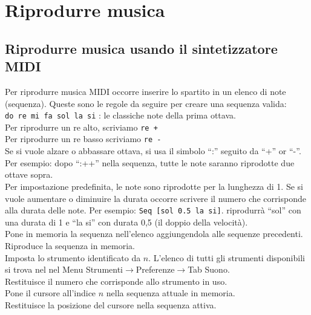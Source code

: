\section{Riprodurre musica}
\subsection{Riprodurre musica usando il sintetizzatore MIDI}
Per riprodurre musica MIDI occorre inserire lo spartito in un elenco di note (sequenza). Queste sono le regole da seguire per creare una sequenza valida:\\
\texttt{do re mi fa sol la si} : le classiche note della prima ottava.\\
Per riprodurre un re alto, scriviamo \texttt{re +}\\
Per riprodurre un re basso scriviamo \texttt{re -}\\
Se si vuole alzare o abbassare ottava, si usa il simbolo ``:'' seguito da ``+'' or ``-''. Per esempio: dopo ``:++'' nella sequenza, tutte le note saranno riprodotte due ottave sopra.\\
Per impostazione predefinita, le note sono riprodotte per la lunghezza di 1. Se si vuole aumentare o diminuire la durata occorre scrivere il numero che corrisponde alla durata delle note. Per esempio: \texttt{Seq [sol 0.5 la si]}. riprodurrà ``sol'' con una durata di 1 e ``la si'' con durata 0,5 (il doppio della velocità).\\


Pone in memoria la sequenza nell'elenco aggiungendola alle sequenze precedenti.\\

Riproduce la sequenza in memoria. \\

Imposta lo strumento identificato da $n$. L'elenco di tutti gli strumenti disponibili si trova nel nel Menu Strumenti$\to$Preferenze$\to$Tab Suono.\\

Restituisce il numero che corrisponde allo strumento in uso. \\

Pone il cursore all'indice $n$ nella sequenza attuale in memoria.\\

Restituisce la posizione del cursore nella sequenza attiva.\\

